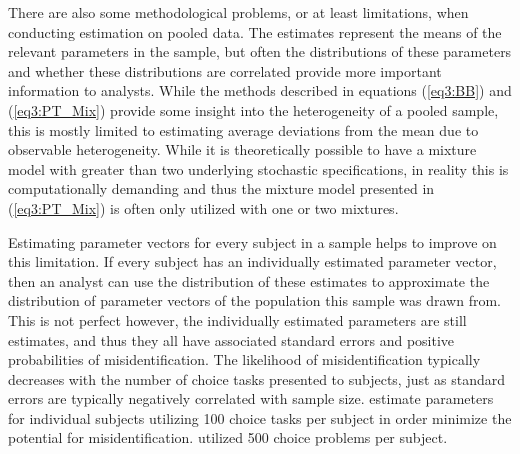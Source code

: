\documentclass[../main.tex]{subfiles}
\begin{document}
There are also some methodological problems, or at least limitations, when conducting estimation on pooled data.
The estimates represent the means of the relevant parameters in the sample, but often the distributions of these parameters and whether these distributions are correlated provide more important information to analysts.{\footnotemark} 
While the methods described in equations (\ref{eq3:BB}) and (\ref{eq3:PT_Mix}) provide some insight into the heterogeneity of a pooled sample, this is mostly limited to estimating average deviations from the mean due to observable heterogeneity.
While it is theoretically possible to have a mixture model with greater than two underlying stochastic specifications, in reality this is computationally demanding and thus the mixture model presented in (\ref{eq3:PT_Mix}) is often only utilized with one or two mixtures.

\addtocounter{footnote}{-1}

Estimating parameter vectors for every subject in a sample helps to improve on this limitation.
If every subject has an individually estimated parameter vector, then an analyst can use the distribution of these estimates to approximate the distribution of parameter vectors of the population this sample was drawn from.
This is not perfect however, the individually estimated parameters are still estimates, and thus they all have associated standard errors and positive probabilities of misidentification.
The likelihood of misidentification typically decreases with the number of choice tasks presented to subjects, just as standard errors are typically negatively correlated with sample size.
\textcite{Hey1994} estimate parameters for individual subjects utilizing 100 choice tasks per subject in order minimize the potential for misidentification.
\textcite{Hey2001} utilized 500 choice problems per subject.
\end{document}
